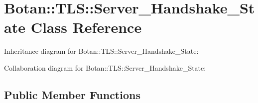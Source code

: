 \hypertarget{class_botan_1_1_t_l_s_1_1_server___handshake___state}{}\section{Botan\+:\+:T\+LS\+:\+:Server\+\_\+\+Handshake\+\_\+\+State Class Reference}
\label{class_botan_1_1_t_l_s_1_1_server___handshake___state}


Inheritance diagram for Botan\+:\+:T\+LS\+:\+:Server\+\_\+\+Handshake\+\_\+\+State\+:


Collaboration diagram for Botan\+:\+:T\+LS\+:\+:Server\+\_\+\+Handshake\+\_\+\+State\+:
\subsection*{Public Member Functions}
